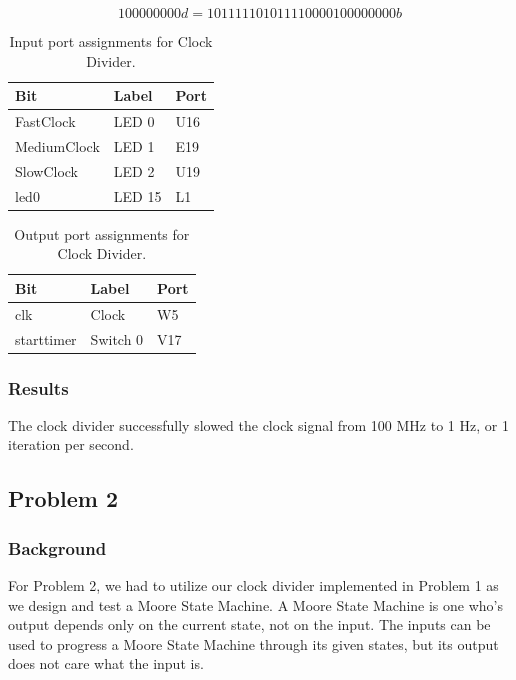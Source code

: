 \documentclass[11pt]{article}
\begin{document}
\begin{equation}
100 000 000d = 101111101011110000100000000b
\label{eqn:decimal_to_binary}
\end{equation}

\begin{table}[H]
\begin{center}
\begin{tabular}{| l | l | l |}
	\hline
	Bit & Label & Port \\ \hline
	FastClock & LED 0 & U16 \\ \hline
	MediumClock & LED 1 & E19 \\ \hline
	SlowClock & LED 2 & U19 \\ \hline
	led0 & LED 15 & L1 \\ \hline
\end{tabular}
\caption{\label{tab:clockDivider_input_Ports}Input port assignments for Clock Divider.}
\end{center}
\end{table}

\begin{table}[H]
\begin{center}
\begin{tabular}{| l | l | l |}
	\hline
	Bit & Label & Port \\ \hline
	clk & Clock & W5 \\ \hline
	starttimer & Switch 0 & V17 \\ \hline
\end{tabular}
\caption{\label{tab:clockDivider_output_Ports}Output port assignments for Clock Divider.}
\end{center}
\end{table}

\subsubsection{Results}
The clock divider successfully slowed the clock signal from 100 MHz to 1 Hz, or 1 iteration per second.

\subsection{Problem 2 }

\subsubsection{Background}
For Problem 2, we had to utilize our clock divider implemented in Problem 1 as we design and test a Moore State Machine. A Moore State Machine is one who's output depends only on the current state, not on the input. The inputs can be used to progress a Moore State Machine through its given states, but its output does not care what the input is. 
\end{document}
